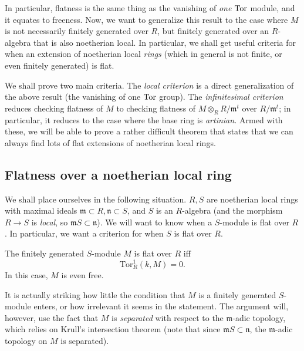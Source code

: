 In particular, flatness is the same thing as the vanishing of \emph{one}
$\operatorname{Tor}$ module, and it equates to freeness. Now, we want to generalize this
result to the case where $M$ is not necessarily finitely generated over $R$,
but finitely generated over an $R$-algebra that is also noetherian local. In
particular, we shall get useful criteria for when an extension of
noetherian local \emph{rings}
(which in general is not finite, or even finitely generated)
is flat.

We shall prove two main criteria. The \emph{local criterion} is a direct
generalization of the above result (the vanishing of one $\operatorname{Tor}$ group). The
\emph{infinitesimal criterion} reduces checking flatness of $M$ to checking
flatness of $M \otimes_R R/\mathfrak{m}^t$ over $R/\mathfrak{m}^t$; in
particular, it reduces to the case where the base ring is \emph{artinian.}
Armed with these, we will be able to prove a rather difficult theorem that
states that we can always find lots of flat extensions of noetherian local
rings.

\subsection{Flatness over a noetherian local ring}

We shall place ourselves in the following situation. $R, S$ are noetherian
local rings with maximal ideals $\mathfrak{m} \subset R, \mathfrak{n} \subset
S$, and $S$ is an $R$-algebra (and the morphism $R \to S$ is \emph{local}, so
$\mathfrak{m}S \subset \mathfrak{n}$).
We will want to know when a $S$-module is flat over $R$. In particular, we
want a criterion for when $S$ is flat over $R$.

\begin{theorem} The finitely generated $S$-module $M$ is flat over $R$ iff
\[ \mathrm{Tor} ^1_R( k, M) = 0.\]
In this case, $M$ is even free.
\end{theorem}

It is actually striking how little the condition that $M$ is a finitely
generated $S$-module enters, or how irrelevant it seems in the statement. The
argument will, however, use the fact that $M$ is \emph{separated} with respect
to the $\mathfrak{m}$-adic topology, which relies on Krull's intersection
theorem (note that since $\mathfrak{m} S \subset \mathfrak{n}$, the
$\mathfrak{m}$-adic topology on $M$ is separated).


